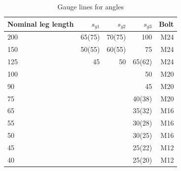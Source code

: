\begin{table}[H]
\centering\footnotesize
\caption{Gauge lines for angles}\label{tab:angle_gauge}
\begin{minipage}{.49\linewidth}\centering
\begin{tabular}{lrrrr}
	\toprule
	Nominal leg length & $s_{g1}$ & $s_{g2}$ & $s_{g3}$ & Bolt \\ \midrule
	200                &   65(75) &   70(75) &      100 &  M24 \\
	150                &   50(55) &   60(55) &       75 &  M24 \\
	125                &       45 &       50 &   65(62) &  M24 \\
	100                &          &          &       50 &  M20 \\
	90                 &          &          &       45 &  M20 \\
	75                 &          &          &   40(38) &  M20 \\
	65                 &          &          &   35(32) &  M16 \\
	55                 &          &          &   30(28) &  M16 \\
	50                 &          &          &   30(25) &  M16 \\
	45                 &          &          &   25(22) &  M12 \\
	40                 &          &          &   25(20) &  M12 \\ \bottomrule
\end{tabular}
\end{minipage}
\begin{minipage}{.5\linewidth}\centering

\end{minipage}
\end{table}
